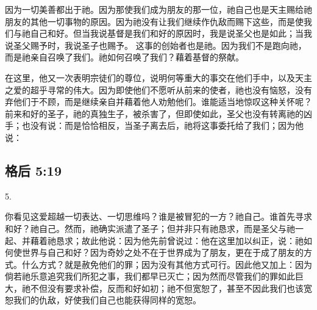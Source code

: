 \par

因为一切美善都出于祂。因为那使我们成为朋友的那一位，祂自己也是天主赐给祂朋友的其他一切事物的原因。因为祂没有让我们继续作仇敌而赐下这些，而是使我们与祂自己和好。但当我说基督是我们和好的原因时，我是说圣父也是如此；当我说圣父赐予时，我说圣子也赐予。 这事的创始者也是祂。因为我们不是跑向祂，而是祂亲自召唤了我们。祂如何召唤了我们？藉着基督的祭献。\par

\par

在这里，他又一次表明宗徒们的尊位，说明何等重大的事交在他们手中，以及天主之爱的超乎寻常的伟大。因为即使他们不愿听从前来的使者，祂也没有恼怒，没有弃他们于不顾，而是继续亲自并藉着他人劝勉他们。谁能适当地惊叹这种关怀呢？前来和好的圣子，祂的真独生子，被杀害了，但即使如此，圣父也没有转离祂的凶手；也没有说：而是恰恰相反，当圣子离去后，祂将这事委托给了我们；因为他说：\par


\subsection{格后 5:19}

5. \par

你看见这爱超越一切表达、一切思维吗？谁是被冒犯的一方？祂自己。谁首先寻求和好？祂自己。然而，祂确实派遣了圣子；但并非只有祂恳求，而是圣父与祂一起、并藉着祂恳求；故此他说：因为他先前曾说过：他在这里加以纠正，说：祂如何使世界与自己和好？因为奇妙之处不在于世界成为了朋友，更在于成了朋友的方式。什么方式？就是赦免他们的罪；因为没有其他方式可行。因此他又加上：因为倘若祂乐意追究我们所犯之事，我们都早已灭亡；因为然而尽管我们的罪如此巨大，祂不但没有要求补偿，反而和好如初；祂不但宽恕了，甚至不因此我们也该宽恕我们的仇敌，好使我们自己也能获得同样的宽恕。\par

